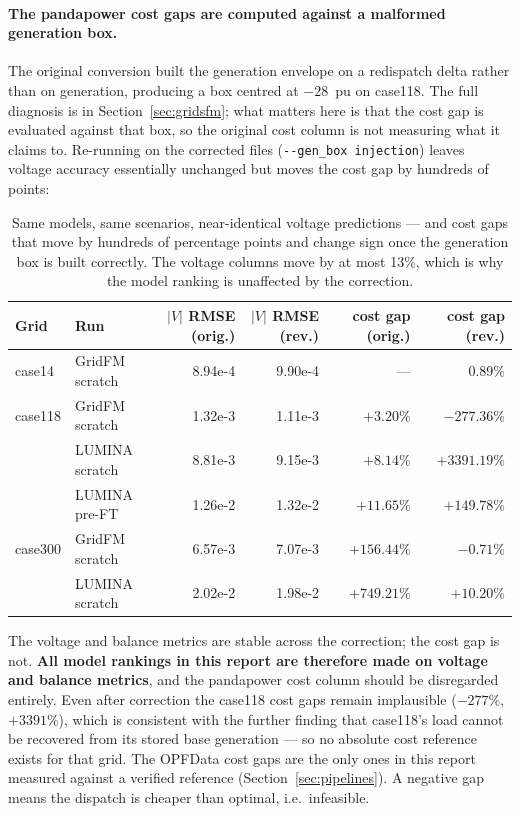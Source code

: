 \documentclass[10pt]{article}
\begin{document}
\paragraph{The pandapower cost gaps are computed against a malformed generation
box.} The original conversion built the generation envelope on a redispatch
delta rather than on generation, producing a box centred at \(-28\)~pu on
case118. The full diagnosis is in Section~\ref{sec:gridsfm}; what matters here is
that the cost gap is evaluated against that box, so the original cost column is
not measuring what it claims to. Re-running on the corrected files
(\texttt{-{}-gen\_box injection}) leaves voltage accuracy essentially unchanged
but moves the cost gap by hundreds of points:

\begin{table}[H]
\centering
\small
\begin{tabular}{llrrrr}
\toprule
Grid & Run & \(|V|\) RMSE (orig.) & \(|V|\) RMSE (rev.) & cost gap (orig.) & cost gap (rev.) \\
\midrule
case14  & GridFM scratch  & 8.94e-4 & 9.90e-4 & --- & 0.89\% \\
case118 & GridFM scratch  & 1.32e-3 & 1.11e-3 & \(+3.20\%\) & \(-277.36\%\) \\
        & LUMINA scratch  & 8.81e-3 & 9.15e-3 & \(+8.14\%\) & \(+3391.19\%\) \\
        & LUMINA pre-FT   & 1.26e-2 & 1.32e-2 & \(+11.65\%\) & \(+149.78\%\) \\
case300 & GridFM scratch  & 6.57e-3 & 7.07e-3 & \(+156.44\%\) & \(-0.71\%\) \\
        & LUMINA scratch  & 2.02e-2 & 1.98e-2 & \(+749.21\%\) & \(+10.20\%\) \\
\bottomrule
\end{tabular}
\caption{Same models, same scenarios, near-identical voltage predictions --- and
cost gaps that move by hundreds of percentage points and change sign once the
generation box is built correctly. The voltage columns move by at most 13\%,
which is why the model ranking is unaffected by the correction.}
\end{table}

The voltage and balance metrics are stable across the correction; the cost gap is
not. \textbf{All model rankings in this report are therefore made on voltage and
balance metrics}, and the pandapower cost column should be disregarded entirely.
Even after correction the case118 cost gaps remain implausible
(\(-277\%\), \(+3391\%\)), which is consistent with the further finding that
case118's load cannot be recovered from its stored base generation --- so no
absolute cost reference exists for that grid. The OPFData cost gaps are the only
ones in this report measured against a verified reference
(Section~\ref{sec:pipelines}). A negative gap means the dispatch is cheaper than
optimal, i.e.\ infeasible.
\end{document}
